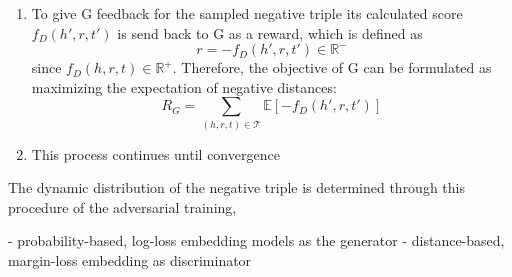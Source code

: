 \begin{enumerate}
    \item 
    To give G feedback for the sampled negative triple  its calculated score $f_D(h',r,t')$ is send back to G as a reward, which is defined as
    \begin{equation}
        r = -f_D(h',r,t') \in \mathbb{R}^-
    \end{equation}
    since $f_D(h,r,t) \in \mathbb{R}^+$.
    Therefore, the objective of G can be formulated as maximizing the expectation of negative distances:
    \begin{equation}
        R_G=\sum_{(h,r,t)\in\mathcal{T}}\mathbb{E}[-f_D(h',r,t')]
    \end{equation}
    
    \item
    This process continues until convergence
\end{enumerate}
The dynamic distribution of the negative triple is determined through this procedure of the adversarial training, 





\cite{cai2017kbgan}
- probability-based, log-loss embedding models as the generator
- distance-based, margin-loss embedding as discriminator
